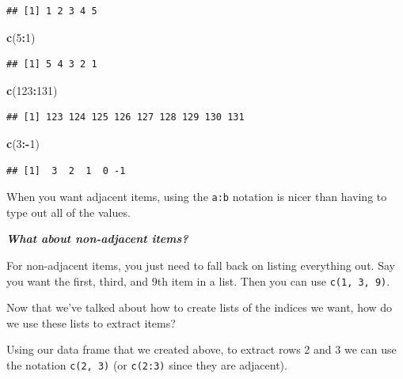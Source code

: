 \documentclass[
  10pt,
  letterpaper,
  twoside,
  openright]{book}
\newenvironment{Shaded}{\begin{snugshade}}{\end{snugshade}}
\newcommand{\DecValTok}[1]{\textcolor[rgb]{0.00,0.00,0.81}{#1}}
\newcommand{\FunctionTok}[1]{\textcolor[rgb]{0.13,0.29,0.53}{\textbf{#1}}}
\newcommand{\NormalTok}[1]{#1}
\newcommand{\SpecialCharTok}[1]{\textcolor[rgb]{0.81,0.36,0.00}{\textbf{#1}}}
\begin{document}
\begin{verbatim}
## [1] 1 2 3 4 5
\end{verbatim}

\begin{Shaded}
\begin{Highlighting}[]
\FunctionTok{c}\NormalTok{(}\DecValTok{5}\SpecialCharTok{:}\DecValTok{1}\NormalTok{)}
\end{Highlighting}
\end{Shaded}

\begin{verbatim}
## [1] 5 4 3 2 1
\end{verbatim}

\begin{Shaded}
\begin{Highlighting}[]
\FunctionTok{c}\NormalTok{(}\DecValTok{123}\SpecialCharTok{:}\DecValTok{131}\NormalTok{)}
\end{Highlighting}
\end{Shaded}

\begin{verbatim}
## [1] 123 124 125 126 127 128 129 130 131
\end{verbatim}

\begin{Shaded}
\begin{Highlighting}[]
\FunctionTok{c}\NormalTok{(}\DecValTok{3}\SpecialCharTok{:{-}}\DecValTok{1}\NormalTok{)}
\end{Highlighting}
\end{Shaded}

\begin{verbatim}
## [1]  3  2  1  0 -1
\end{verbatim}

When you want adjacent items, using the \texttt{a:b} notation is nicer
than having to type out all of the values.

\textbf{\emph{What about non-adjacent items?}}

For non-adjacent items, you just need to fall back on listing everything
out. Say you want the first, third, and 9th item in a list. Then you can
use \texttt{c(1,\ 3,\ 9)}.

Now that we've talked about how to create lists of the indices we want,
how do we use these lists to extract items?

Using our data frame that we created above, to extract rows 2 and 3 we
can use the notation \texttt{c(2,\ 3)} (or \texttt{c(2:3)} since they
are adjacent).
\end{document}
